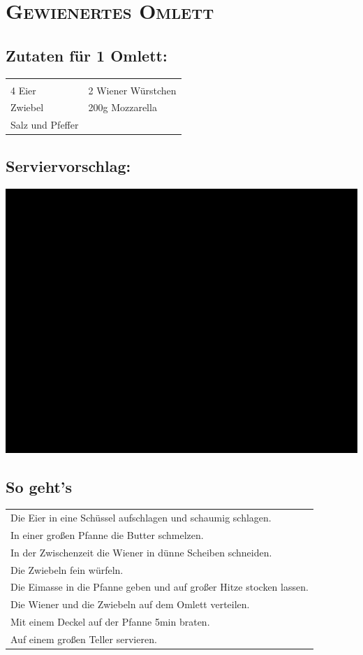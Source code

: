 \section{\textsc{Gewienertes Omlett}}

\subsection*{Zutaten für 1 Omlett:}

\begin{tabular}{p{7.5cm} p{7.5cm}}
	& \\
	4 Eier & 2 Wiener Würstchen \\
	\sfrac{1}{2} Zwiebel & 200g Mozzarella \\
	Salz und Pfeffer &
\end{tabular}

\subsection*{Serviervorschlag:}

\includegraphics[width=\textwidth]{img/ph.jpg}

\subsection*{So geht's}

\begin{tabular}{p{15cm}}
	Die Eier in eine Schüssel aufschlagen und schaumig schlagen.\\
	In einer großen Pfanne die Butter schmelzen.\\
	In der Zwischenzeit die Wiener in dünne Scheiben schneiden.\\
	Die Zwiebeln fein würfeln.\\
	Die Eimasse in die Pfanne geben und auf großer Hitze stocken lassen.\\
	Die Wiener und die Zwiebeln auf dem Omlett verteilen.\\
	Mit einem Deckel auf der Pfanne 5min braten.\\
	Auf einem großen Teller servieren.
\end{tabular}
